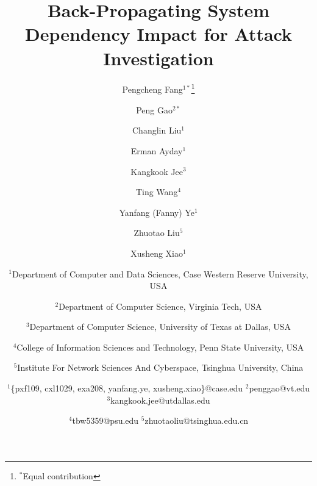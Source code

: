 \documentclass[letterpaper,twocolumn,10pt]{article}
\begin{document}

\date{}


\title{\Large \bf Back-Propagating System Dependency Impact for Attack Investigation}
\renewcommand\footnotemark{}

\author{
{\rm Pengcheng Fang$^{1*}$}\thanks{$^*$Equal contribution}
\and
{\rm Peng Gao$^{2*}$}
\and
{\rm Changlin Liu$^1$}
\and
{\rm Erman Ayday$^1$}
\and
{\rm Kangkook Jee$^3$}
\and
{\rm Ting Wang$^4$}
\and
{\rm Yanfang (Fanny) Ye$^1$}
\and
{\rm Zhuotao Liu$^5$}
\and
{\rm Xusheng Xiao$^1$}
\and
{\normalsize $^1$Department of Computer and Data Sciences, Case Western Reserve University, USA}
\and
{\normalsize $^2$Department of Computer Science, Virginia Tech, USA}
\and
{\normalsize $^3$Department of Computer Science, University of Texas at Dallas, USA}
\and
{\normalsize $^4$College of Information Sciences and Technology, Penn State University, USA}
\and
{\normalsize $^5$Institute For Network Sciences And Cyberspace, Tsinghua University, China}
\and
{\normalsize $^1$\{pxf109, cxl1029, exa208, yanfang.ye, xusheng.xiao\}@case.edu\; $^2$penggao@vt.edu\; $^3$kangkook.jee@utdallas.edu}
\and
{\normalsize $^4$tbw5359@psu.edu\; $^5$zhuotaoliu@tsinghua.edu.cn}


}
\end{document}

